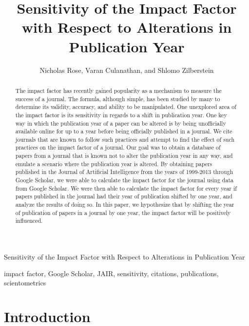 \documentclass[times]{jtitauth}
\begin{document}
\title{Sensitivity of the Impact Factor\\
with Respect to Alterations in Publication Year\\
}

\author{Nicholas Rose,  Varan Culanathan, and Shlomo Zilberstein}

{Sensitivity of the Impact Factor with Respect to Alterations in Publication Year}

\maketitle

\begin{abstract}
The impact factor has recently gained popularity as a mechanism to measure the success of a journal. The formula, although simple, has been studied by many to determine its validity, accuracy, and ability to be manipulated. One unexplored area of the impact factor is its sensitivity in regards to a shift in publication year. One key way in which the publication year of a paper can be altered is by being unofficially available online for up to a year before being officially published in a journal. We cite journals that are known to follow such practices and attempt to find the effect of such practices on the impact factor of a journal. Our goal was to obtain a database of papers from a journal that is known not to alter the publication year in any way, and emulate a scenario where the publication year is altered. By obtaining papers published in the Journal of Artificial Intelligence from the years of 1999-2013 through Google Scholar, we were able to calculate the impact factor for the journal using data from Google Scholar. We were then able to calculate the impact factor for every year if papers published in the journal had their year of publication shifted by one year, and analyze the results of doing so. In this paper, we hypothesize that by shifting the year of publication of papers in a journal by one year, the impact factor will be positively influenced.     
\end {abstract}

\begin{keywords}
impact factor, Google Scholar, JAIR, sensitivity, citations, publications, scientometrics
\end{keywords}

\section{Introduction}
\end{document}
